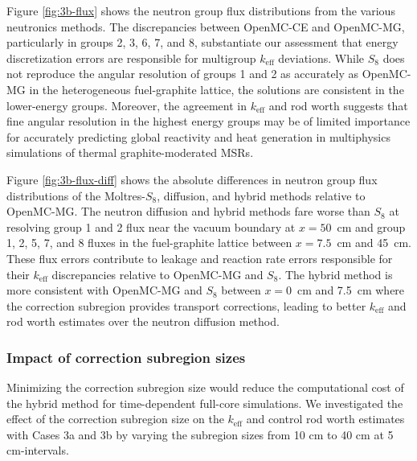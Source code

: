 Figure \ref{fig:3b-flux} shows the neutron group flux distributions from the various neutronics
methods. The discrepancies between OpenMC-CE and OpenMC-MG, particularly in groups 2, 3, 6, 7, and
8, substantiate our assessment that energy discretization errors are responsible for
multigroup $k_\text{eff}$ deviations.
While $S_8$ does not reproduce the angular resolution of groups 1 and 2 as accurately as OpenMC-MG
in the heterogeneous fuel-graphite lattice, the solutions are consistent in the lower-energy
groups. Moreover, the agreement in $k_\text{eff}$ and rod worth suggests that fine angular
resolution in the highest energy groups may be of limited importance for accurately predicting
global reactivity and heat generation in multiphysics simulations of thermal graphite-moderated
\glspl{MSR}.

Figure \ref{fig:3b-flux-diff} shows the absolute differences in neutron group flux distributions of
the Moltres-$S_8$, diffusion, and hybrid methods relative to OpenMC-MG. The neutron diffusion and
hybrid methods fare worse than $S_8$ at
resolving group 1 and 2 flux near the vacuum boundary at $x=50$~cm and group 1, 2, 5, 7, and 8
fluxes in the fuel-graphite lattice between $x=7.5$~cm and 45~cm. These flux errors contribute to
leakage and reaction rate errors responsible for their $k_\text{eff}$ discrepancies relative to
OpenMC-MG and $S_8$. The hybrid method is more
consistent with OpenMC-MG and $S_8$ between $x=0$~cm and 7.5~cm where the correction subregion
provides transport corrections, leading to better $k_\text{eff}$ and rod worth estimates over the
neutron diffusion method.

\subsubsection{Impact of correction subregion sizes}

Minimizing the correction subregion size would reduce the computational cost of the hybrid method
for time-dependent full-core simulations.
We investigated the effect of the correction subregion size on the $k_\text{eff}$ and
control rod worth estimates with Cases 3a and 3b by varying the subregion sizes from 10 cm to 40 cm
at 5 cm-intervals.

